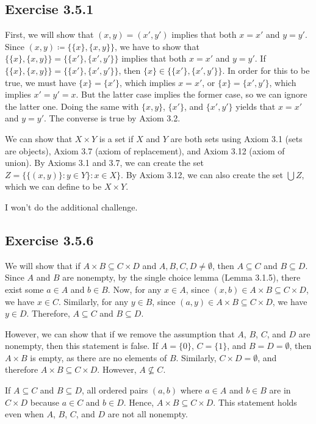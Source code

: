 \documentclass[12pt, oneside]{book}
\begin{document}
	\subsection*{Exercise 3.5.1}

	First, we will show that $(x, y) = (x', y')$ implies that both $x = x'$ and $y = y'$. Since $(x, y) \coloneqq \{\{x\}, \{x, y\}\}$, we have to show that $\{\{x\}, \{x, y\}\} = \{\{x'\}, \{x', y'\}\}$ implies that both $x = x'$ and $y = y'$. If $\{\{x\}, \{x, y\}\} = \{\{x'\}, \{x', y'\}\}$, then $\{x\} \in \{\{x'\}, \{x', y'\}\}$. In order for this to be true, we must have $\{x\} = \{x'\}$, which implies $x = x'$, or $\{x\} = \{x', y'\}$, which implies $x' = y' = x$. But the latter case implies the former case, so we can ignore the latter one. Doing the same with $\{x, y\}$, $\{x'\}$, and $\{x', y'\}$ yields that $x = x'$ and $y = y'$. The converse is true by Axiom 3.2.

	We can show that $X \times Y$ is a set if $X$ and $Y$ are both sets using Axiom 3.1 (sets are objects), Axiom 3.7 (axiom of replacement), and Axiom 3.12 (axiom of union). By Axioms 3.1 and 3.7, we can create the set $Z = \{\{(x, y)\}: y \in Y\}: x \in X\}$. By Axiom 3.12, we can also create the set $\bigcup Z$, which we can define to be $X \times Y$.

	I won't do the additional challenge.

	\subsection*{Exercise 3.5.6}

	We will show that if $A \times B \subseteq C \times D$ and $A, B, C, D \ne \emptyset$, then $A \subseteq C$ and $B \subseteq D$. Since $A$ and $B$ are nonempty, by the single choice lemma (Lemma 3.1.5), there exist some $a \in A$ and $b \in B$. Now, for any $x \in A$, since $(x, b) \in A \times B \subseteq C \times D$, we have $x \in C$. Similarly, for any $y \in B$, since $(a, y) \in A \times B \subseteq C \times D$, we have $y \in D$. Therefore, $A \subseteq C$ and $B \subseteq D$.

	However, we can show that if we remove the assumption that $A$, $B$, $C$, and $D$ are nonempty, then this statement is false. If $A = \{0\}$, $C = \{1\}$, and $B = D = \emptyset$, then $A \times B$ is empty, as there are no elements of $B$. Similarly, $C \times D = \emptyset$, and therefore $A \times B \subseteq C \times D$. However, $A \not \subseteq C$.

	If $A \subseteq C$ and $B \subseteq D$, all ordered pairs $(a, b)$ where $a \in A$ and $b \in B$ are in $C \times D$ because $a \in C$ and $b \in D$. Hence, $A \times B \subseteq C \times D$. This statement holds even when $A$, $B$, $C$, and $D$ are not all nonempty.
\end{document}
